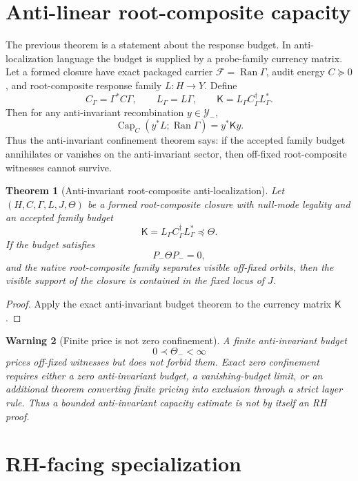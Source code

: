 \documentclass[11pt]{article}
\newtheorem{theorem}{Theorem}[section]
\newtheorem{warning}[theorem]{Warning}
\newcommand{\Kmat}{\mathsf K}
\newcommand{\ThetaB}{\mathsf\Theta}
\newcommand{\Ran}{\operatorname{Ran}}
\newcommand{\Capacity}{\operatorname{Cap}}
\begin{document}
\section{Anti-linear root-composite capacity}

The previous theorem is a statement about the response budget.  In anti-localization language the budget is supplied by a probe-family currency matrix.
Let a formed closure have exact packaged carrier $\mathcal F=\Ran\Gamma$, audit energy $C\succeq0$, and root-composite response family $L:H\to Y$.  Define
\[
C_\Gamma=\Gamma^*C\Gamma,
\qquad
L_\Gamma=L\Gamma,
\qquad
\Kmat=L_\Gamma C_\Gamma^\dagger L_\Gamma^*.
\]
Then for any anti-invariant recombination $y\in\mathcal Y_-$,
\[
\Capacity_C(y^*L;\Ran\Gamma)=y^*\Kmat y.
\]
Thus the anti-invariant confinement theorem says: if the accepted family budget annihilates or vanishes on the anti-invariant sector, then off-fixed root-composite witnesses cannot survive.

\begin{theorem}[Anti-invariant root-composite anti-localization]
Let $(H,C,\Gamma,L,J,\ThetaB)$ be a formed root-composite closure with null-mode legality and an accepted family budget
\[
\Kmat=L_\Gamma C_\Gamma^\dagger L_\Gamma^*\preceq\ThetaB.
\]
If the budget satisfies
\[
P_-\ThetaB P_-=0,
\]
and the native root-composite family separates visible off-fixed orbits, then the visible support of the closure is contained in the fixed locus of $J$.
\end{theorem}

\begin{proof}
Apply the exact anti-invariant budget theorem to the currency matrix $\Kmat$.
\end{proof}

\begin{warning}[Finite price is not zero confinement]
A finite anti-invariant budget
\[
0\prec \Theta_-<\infty
\]
prices off-fixed witnesses but does not forbid them.  Exact zero confinement requires either a zero anti-invariant budget, a vanishing-budget limit, or an additional theorem converting finite pricing into exclusion through a strict layer rule.  Thus a bounded anti-invariant capacity estimate is not by itself an RH proof.
\end{warning}

\section{RH-facing specialization}
\end{document}
